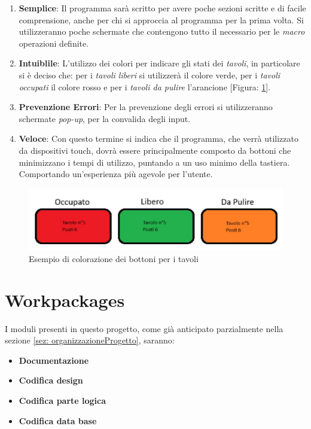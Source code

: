 \documentclass[12pt, letterpaper]{book}
\begin{document}
\begin{enumerate}
    \item \textbf{Semplice}: Il programma sarà scritto per avere poche sezioni scritte e di facile comprensione, anche per chi si approccia al programma per la prima volta. Si utilizzeranno poche schermate che contengono tutto il necessario per le \textit{macro} operazioni definite.
    \item \textbf{Intuiblile}: L'utilizzo dei colori per indicare gli stati dei \textit{tavoli}, in particolare si è deciso che: per i \textit{tavoli liberi} si utilizzerà il colore verde, per i \textit{tavoli occupati} il colore rosso e per i \textit{tavoli da pulire} l'arancione [Figura: \ref{fig: es_bottoni}].
    \item \textbf{Prevenzione Errori}: Per la prevenzione degli errori si utilizzeranno schermate \textit{pop-up}, per la convalida degli input.
    \item \textbf{Veloce}: Con questo termine si indica che il programma, che verrà utilizzato da dispositivi touch, dovrà essere principalmente composto da bottoni che minimizzano i tempi di utilizzo, puntando a un uso minimo della tastiera. Comportando un'esperienza più agevole per l'utente.
\end{enumerate}

\begin{figure}[h]
    \centering
    \includegraphics[width=0.6\linewidth]{Esempio_Bottoni.jpg}
    \caption{Esempio di colorazione dei bottoni per i tavoli}
    \label{fig: es_bottoni}
\end{figure}


\section{Workpackages}

I moduli presenti in questo progetto, come già anticipato parzialmente nella sezione \ref{sez: organizzazioneProgetto}, saranno:
\begin{itemize}
    \item \textbf{Documentazione}
    \item \textbf{Codifica design}
    \item \textbf{Codifica parte logica}
    \item \textbf{Codifica data base}
\end{itemize}
\end{document}
